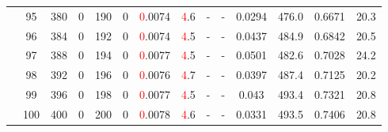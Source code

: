 \begin{table}[htb]
{\begin{tabular}{|c|c|c|c|c|c|c|c|c|c|c|c|c|c|}
 & 
95 & 380 & 0 & 190 & 0
 & \textcolor{red}0.0074 & \textcolor{red}4.6
 & - & -
 & 0.0294 & 476.0
 & 0.6671 & 20.3
 \\
 & 
96 & 384 & 0 & 192 & 0
 & \textcolor{red}0.0074 & \textcolor{red}4.5
 & - & -
 & 0.0437 & 484.9
 & 0.6842 & 20.5
 \\
 & 
97 & 388 & 0 & 194 & 0
 & \textcolor{red}0.0077 & \textcolor{red}4.5
 & - & -
 & 0.0501 & 482.6
 & 0.7028 & 24.2
 \\
 & 
98 & 392 & 0 & 196 & 0
 & \textcolor{red}0.0076 & \textcolor{red}4.7
 & - & -
 & 0.0397 & 487.4
 & 0.7125 & 20.2
 \\
 & 
99 & 396 & 0 & 198 & 0
 & \textcolor{red}0.0077 & \textcolor{red}4.5
 & - & -
 & 0.043 & 493.4
 & 0.7321 & 20.8
 \\
 & 
100 & 400 & 0 & 200 & 0
 & \textcolor{red}0.0078 & \textcolor{red}4.6
 & - & -
 & 0.0331 & 493.5
 & 0.7406 & 20.8
 \\
\hline
\end{tabular}}
\end{table}
